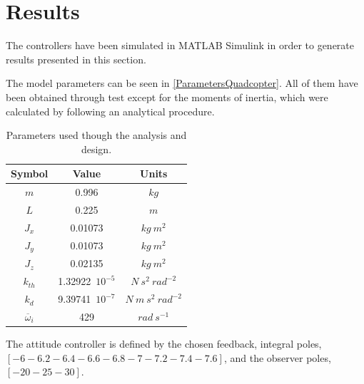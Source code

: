 \section{Results}

The controllers have been simulated in MATLAB Simulink in order to generate results presented in this section. 

The model parameters can be seen in \autoref{ParametersQuadcopter}. All of them have been obtained through test except for the moments of inertia, which were calculated by following an analytical procedure.

\begin{table}[H]
    \centering
    \begin{tabular}{c|c|c}
        \textbf{Symbol} &\textbf{Value} &\textbf{Units}\\
        \hline %
        $m$ & 0.996       &$kg$\\
        \hline %
        $L$  &   0.225       & $m$\\
        \hline %
        $J_x$  & 0.01073       & $kg \  m^2$\\
        \hline %
        $J_y$  & 0.01073       & $kg \  m^2$\\
        \hline %
        $J_z$  & 0.02135       & $kg \  m^2$\\
        \hline %
        $k_{th}$  & 1.32922\ $10^{-5}$       & $N \  s^2 \  rad^{-2}$\\
        \hline %
        $k_{d}$  & 9.39741\ $10^{-7}$       & $N \  m \  s^2 \  rad^{-2}$\\
        \hline %
        $\overline{\omega}_i$& 429      & $rad \ s^{-1}$\\
        
    \end{tabular}
    \caption{Parameters used though the analysis and design.}
    \label{ParametersQuadcopter}
\end{table}
The attitude controller is defined by the chosen feedback, integral poles, $[-6 -6.2 -6.4 -6.6 -6.8 -7 -7.2 -7.4 -7.6]$, and  the observer poles, $[-20 -25 -30]$.

